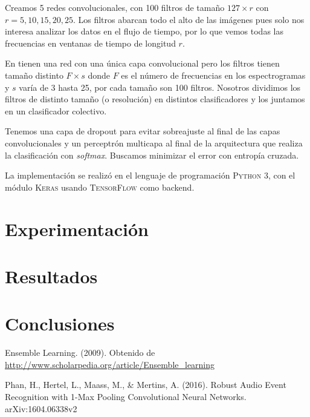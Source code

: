 \documentclass[spanish,11pt,letterpaper]{article}
\begin{document}
Creamos 5 redes convolucionales, con 100 filtros de tamaño $127 \times r$ con
$r = 5,10,15,20,25$. Los filtros abarcan todo el alto de las imágenes pues solo
nos interesa analizar los datos en el flujo de tiempo, por lo que vemos todas
las frecuencias en ventanas de tiempo de longitud $r$.

En \cite{audio_recognition} tienen una red con una única
capa convolucional pero los filtros tienen tamaño distinto $F \times s$ donde
$F$ es el número de frecuencias en los espectrogramas y $s$ varía de 3 hasta 25,
por cada tamaño son 100 filtros. Nosotros dividimos los filtros de distinto
tamaño (o resolución) en distintos clasificadores y los juntamos en un clasificador
colectivo.

Tenemos una capa de dropout para evitar sobreajuste al final de las capas
convolucionales y un perceptrón multicapa al final de la arquitectura que realiza
la clasificación con \textit{softmax}. Buscamos minimizar el error con
entropía cruzada.

La implementación se realizó en el lenguaje de programación \textsc{Python 3},
con el módulo \textsc{Keras} usando \textsc{TensorFlow} como backend.

\section{Experimentación}

\section{Resultados}

\section{Conclusiones}

\begin{thebibliography}{9}
Ensemble Learning. (2009). Obtenido de
\url{http://www.scholarpedia.org/article/Ensemble_learning}

Phan, H., Hertel, L., Maass, M., \& Mertins, A. (2016).
Robust Audio Event Recognition with 1-Max Pooling Convolutional Neural Networks.
arXiv:1604.06338v2

\end{thebibliography}
\end{document}
